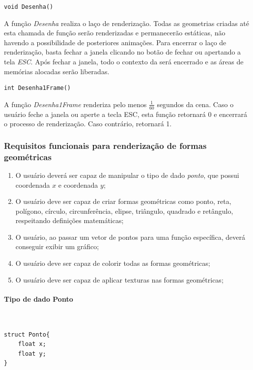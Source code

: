 
\begin{lstlisting}
void Desenha()
\end{lstlisting}


A função \emph{Desenha} realiza o laço de renderização. Todas as geometrias criadas até esta chamada de função serão renderizadas e permanecerão estáticas, não havendo a possibilidade de posteriores animações.
Para encerrar o laço de renderização, basta fechar a janela clicando no botão de fechar ou apertando a tela \emph{ESC}. Após fechar a janela, todo o contexto da \playAPC{} será encerrado e as áreas de memórias alocadas serão liberadas.

  
\begin{lstlisting}
int Desenha1Frame()
\end{lstlisting}


A função \emph{Desenha1Frame} renderiza pelo menos $\frac{1}{60}$ segundos da cena. Caso o usuário feche a janela ou aperte a tecla ESC, esta função retornará 0 e encerrará o processo de renderização. Caso contrário, retornará 1.

 \subsubsection{Requisitos funcionais para renderização de formas geométricas}
 \begin{enumerate}
 \item O usuário deverá ser capaz de manipular o tipo de dado \emph{ponto}, que possui coordenada $x$ e coordenada $y$;
 \item O usuário deve ser capaz de criar formas geométricas como ponto, reta, polígono, círculo, circunferência, elipse, triângulo, quadrado e retângulo, respeitando definições matemáticas;
 \item O usuário, ao passar um vetor de pontos para uma função específica, deverá conseguir exibir um gráfico;
 \item O usuário deve ser capaz de colorir todas as formas geométricas;
 \item O usuário deve ser capaz de aplicar texturas nas formas geométricas;
 \end{enumerate}

\paragraph{Tipo de dado Ponto}\mbox{}\\

 
\begin{lstlisting} 
struct Ponto{
    float x;
    float y;
}
\end{lstlisting}


